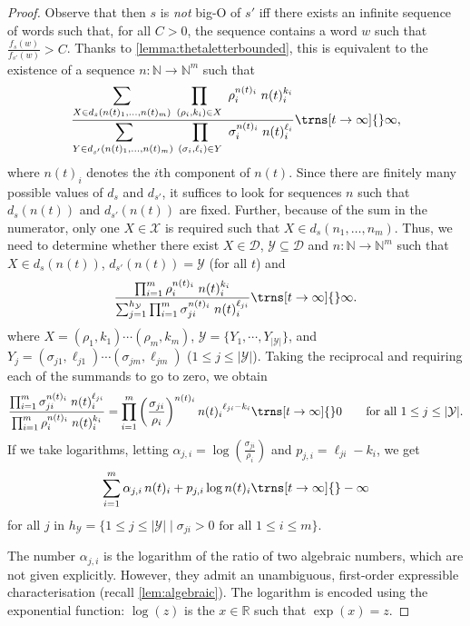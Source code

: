 \documentclass{lmcs}
\theoremstyle{plain}
\theoremstyle{definition}
\theoremstyle{remark}
\newcommand\dgf{d}
\newcommand\adm{\mathcal{D}}
\renewcommand\nu{f}
\begin{document}
\begin{proof}
Observe that then $s$ is \emph{not} big-O of $s'$ iff there exists an infinite sequence of words such that, for  all $C >0$,
the sequence contains a word $w$ such that $\frac{\nu_s(w)}{\nu_{s'}(w)} > C$.
Thanks to \cref{lemma:thetaletterbounded}, this is equivalent to the existence of  a sequence $n : \mathbb{N} \to \mathbb{N}^m$ such that \begin{equation*}
\frac{\displaystyle\sum_{X\in \dgf_{s}(n(t)_1,\dots, n(t)_m)} \; \prod_{(\rho_i,k_i) \in X} \  \rho_i^{n(t)_i}\; n(t)_i^{k_i}}{\displaystyle\sum_{Y\in \dgf_{s'}(n(t)_1,\dots, n(t)_m) \;}\prod_{(\sigma_i,\ell_i) \in Y} \  \sigma_i^{n(t)_i}\; n(t)_i^{\ell_i}} \trns[t\to\infty]{} \infty,
\end{equation*}
where $n(t)_i$ denotes  the $i$th component of $n(t)$.
Since there are finitely many possible values of $\dgf_s$ and $\dgf_{s'}$, it suffices to look for sequences $n$ such that $\dgf_s(n(t))$ and $\dgf_{s'}(n(t))$ are fixed.
Further, because of the sum in the numerator, only one $X \in \mathcal{X}$ is required such that $X \in \dgf_s(n_1,\dots,n_m)$.
Thus, we need to determine
whether there exist $X\in\adm$, $\mathcal{Y}\subseteq \adm$ and $n: \mathbb{N} \to \mathbb{N}^m$
such that $X \in \dgf_s(n(t))$, $\dgf_{s'}(n(t)) =\mathcal{Y}$ (for all $t$) and
\begin{equation*}
\frac{\prod_{i=1}^m \rho_i^{n(t)_i}\; n(t)_i^{k_i}}{\sum_{j=1}^{h_\mathcal{Y}} \prod_{i=1}^m \sigma_{ji}^{n(t)_i}\; n(t)_i^{\ell_{ji}}} \trns[t\to\infty]{} \infty.
\end{equation*}
where $X = (\rho_1, k_1)\cdots (\rho_m, k_m)$,
$\mathcal{Y} = \{ Y_1,\cdots, Y_{|\mathcal{Y}|} \}$, and $Y_j= (\sigma_{j1},\ell_{j1})\cdots(\sigma_{jm},\ell_{jm})$ ($1\le j\le |\mathcal{Y}|$).
Taking the reciprocal and requiring each of the summands to go to zero, we obtain
\[
\frac{\prod_{i=1}^m \sigma_{ji}^{n(t)_i}\; n(t)_i^{\ell_{ji}}}{\prod_{i=1}^m \rho_i^{n(t)_i} \; n(t)_i^{k_i}}= \prod_{i = 1}^m\left(\frac{\sigma_{ji}}{\rho_i}\right)^{{n(t)_i}} {n(t)_i}^{\ell_{ji} - k_i }  \trns[t\to\infty]{} 0
\qquad \text{for all $1\le j\le |\mathcal{Y}|$.}
\]
If we take  logarithms, letting $\alpha_{j,i} = \log(\frac{\sigma_{ji}}{\rho_i})$ and $p_{j,i} = \ell_{ji} - k_i$, we get
\[
\sum_{i = 1}^m \alpha_{j,i} \,n(t)_i +  p_{j,i}\log n(t)_i \trns[t\to\infty]{} -\infty\] for all $j $ in $h_\mathcal{Y}= \{ 1\le j \le |\mathcal{Y}| \mid  \sigma_{ji} >0 \text{ for all }  1\le i\le m \}.$

The number $\alpha_{j,i}$ is the logarithm of the ratio of two algebraic numbers, which are not given explicitly. However, they admit an unambiguous, first-order expressible characterisation (recall \cref{lem:algebraic}). The logarithm is encoded using the exponential function: $\log(z)$ is the $x \in \mathbb{R}$ such that $\exp(x) = z$.
\end{proof}
\end{document}
